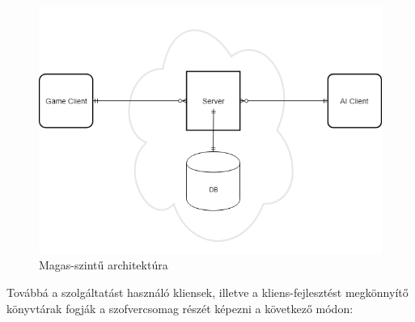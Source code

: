 \documentclass[twoside, a4paper, 12pt]{book}
\begin{document}
\begin{figure}[htbp]
	\centering
	\includegraphics[width=1.0\textwidth]{img/highLevelArchitecture.png}
	\caption{Magas-szintű architektúra}
	\label{fig:highLevelArchitecture}
\end{figure}

Továbbá a szolgáltatást használó kliensek, illetve a kliens-fejlesztést megkönnyítő könyvtárak fogják a szofvercsomag részét képezni a következő módon:
\end{document}

